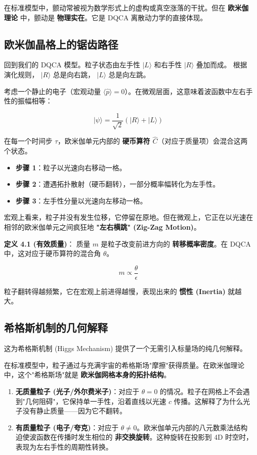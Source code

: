 在标准模型中，颤动常被视为数学形式上的虚构或真空涨落的干扰。但在 \textbf{欧米伽理论} 中，颤动是 \textbf{物理实在}。它是 DQCA 离散动力学的直接体现。

\subsection{欧米伽晶格上的锯齿路径}

回到我们的 DQCA 模型。粒子状态由左手性 $|L\rangle$ 和右手性 $|R\rangle$ 叠加而成。
根据演化规则， $|R\rangle$ 总是向右跳， $|L\rangle$ 总是向左跳。

考虑一个静止的电子（宏观动量 $\langle \hat{p} \rangle = 0$）。在微观层面，这意味着波函数中左右手性的振幅相等：

\[|\psi\rangle = \frac{1}{\sqrt{2}} (|R\rangle + |L\rangle)\]

在每一个时间步 $\tau$，欧米伽单元内部的 \textbf{硬币算符 $\hat{C}$}（对应于质量项）会混合这两个状态。

\begin{itemize}
\item \textbf{步骤 1}：粒子以光速向右移动一格。
\item \textbf{步骤 2}：遭遇拓扑散射（硬币翻转），一部分概率幅转化为左手性。
\item \textbf{步骤 3}：左手性分量以光速向左移动一格。
\end{itemize}

宏观上看来，粒子并没有发生位移，它停留在原地。但在微观上，它正在以光速在相邻的欧米伽单元之间疯狂地 \textbf{"左右横跳" (Zig-Zag Motion)}。

\textbf{定义 4.1 (有效质量)}：
质量 $m$ 是粒子改变前进方向的 \textbf{转移概率密度}。在 DQCA 中，这对应于硬币算符的混合角 $\theta$。

\[m \propto \frac{\theta}{\epsilon}\]

粒子翻转得越频繁，它在宏观上前进得越慢，表现出来的 \textbf{惯性 (Inertia)} 就越大。

\subsection{希格斯机制的几何解释}

这为希格斯机制 (Higgs Mechanism) 提供了一个无需引入标量场的纯几何解释。

在标准模型中，粒子通过与充满宇宙的希格斯场"摩擦"获得质量。在欧米伽理论中，这个"希格斯场"就是 \textbf{欧米伽网格本身的拓扑结构}。

\begin{enumerate}
\item \textbf{无质量粒子 (光子/外尔费米子)}：对应于 $\theta = 0$ 的情况。粒子在网格上不会遇到"几何阻碍"，它保持单一手性，沿着直线以光速 $c$ 传播。这解释了为什么光子没有静止质量——因为它不翻转。
\item \textbf{有质量粒子 (电子/夸克)}：对应于 $\theta \neq 0$。欧米伽单元内部的八元数乘法结构迫使波函数在传播时发生相位的 \textbf{非交换旋转}。这种旋转在投影到 4D 时空时，表现为左右手性的周期性转换。
\end{enumerate}

